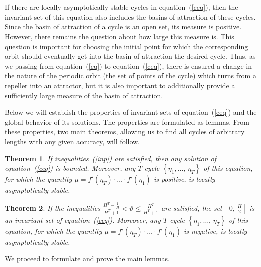 \documentclass[12pt,a4paper]{amsart}
\newtheorem{theorem}{Theorem}
\begin{document}
\section{}

If there are locally asymptotically stable cycles in equation~(\ref{ceq}), then the invariant set of this equation also includes the basins of 
attraction of these cycles. Since the basin of attraction of a cycle is an open set, its measure is positive. However, there remains the question 
about how large this measure is. This question is important for choosing the initial point for which the corresponding orbit should eventually 
get into the basin of attraction the desired cycle. Thus, as we passing from equation~(\ref{eq}) to equation~(\ref{ceq}), there is ensured a change 
in the nature of the periodic orbit (the set of points of the cycle) which turns from a repeller into an attractor, but it is also important 
to additionally provide a sufficiently large measure of the basin of attraction. 

Below we will establish the properties of invariant sets of equation~(\ref{ceq}) and the global behavior of its solutions. 
The properties are formulated as lemmas. From these properties, two main theorems, allowing us to find all cycles of arbitrary 
lengths with any given accuracy, will follow. 

\begin{theorem}\label{t2}
If inequalities~(\ref{inp}) are satisfied, then any solution of equation~(\ref{ceq}) is bounded. Moreover, any $T$-cycle $\left\{\eta_1,\ldots,\,\eta_T\right\}$ 
of this equation, for which the quantity $\mu = f'(\eta_T)\cdot\ldots\cdot f'(\eta_1)$ is positive, is locally asymptotically stable.
\end{theorem}

\begin{theorem}\label{t3}
If the inequalities $\frac{H^T-\frac{1}{H}}{H^T+1}<\vartheta\leq\frac{H^T}{H^T+1}$ are satisfied, the set $\left[0,\,\frac{H}{2}\right]$ is an invariant set
of equation~(\ref{ceq}). Moreover, any $T$-cycle $\left\{\eta_1,\ldots,\,\eta_T\right\}$ of this equation, for which the quantity 
$\mu = f'(\eta_T)\cdot\ldots\cdot f'(\eta_1)$ is negative, is locally asymptotically stable.
\end{theorem}

We proceed to formulate and prove the main lemmas.
\end{document}
